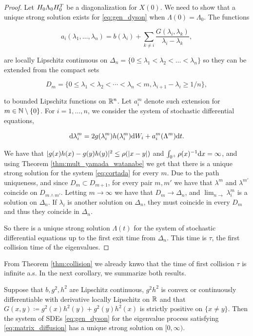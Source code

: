 \begin{proof}
    Let $H_0 \Lambda_0 H_0^T$ be a diagonalization for $X(0)$. We need to show that a unique strong solution exists for \eqref{eq:gen_dyson} when $\Lambda(0)=\Lambda_0$. The functions
    
    \[ a_i(\lambda_1, \dots,\lambda_n) = b(\lambda_i) + \sum_{k \neq i} \frac{G(\lambda_i,\lambda_k)}{\lambda_i - \lambda_k}, \]

    \noindent are locally Lipschitz continuous on $\Delta_n = \{ 0 \le \lambda_1 < \lambda_2 < \dots < \lambda_n \}$ so they can be extended from the compact sets 

    \[ D_m = \{ 0 \le \lambda_1 < \lambda_2 < \cdots < \lambda_n < m, \lambda_{i+1} - \lambda_i \ge 1/n \}, \]

    \noindent to bounded Lipschitz functions on $\mathbb R^n$. Let $a_i^m$ denote such extension for $m \in \mathbb N \setminus \{0\}$. For $i = 1, \dots, n$, we consider the system of stochastic differential equations,

    \begin{equation}
        \mathrm d \lambda^m_i = 2g(\lambda_i^m)h(\lambda_i^m)\mathrm d W_i + a_i^m(\Lambda^m) \mathrm d t. \label{eq:cortada}
    \end{equation}

    We have that $\lvert g(x)h(x) - g(y)h(y) \rvert^2 \le \rho(\lvert x-y \rvert)$ and $\int_{0^+} \rho(x)^{-1}\mathrm d x=\infty$, and using Theorem \ref{thm:mult_yamada_watanabe} we get that there is a unique strong solution for the system \eqref{eq:cortada} for every $m$. Due to the path uniqueness, and since $D_m \subset D_{m+1}$, for every pair $m,m'$ we have that $\lambda^m$ and $\lambda^{m'}$ coincide on $D_{m \wedge m'}$. Letting $m\to \infty$ we have that $D_m \to \Delta_n$, and $\lim_{n\to}\lambda_i^m$ is a solution on $\Delta_n$. If $\lambda_i$ is another solution on $\Delta_n$, they must coincide in every $D_m$ and thus they coincide in $\Delta_n$. 
    
    So there is a unique strong solution $\Lambda(t)$ for the system of stochastic differential equations up to the first exit time from $\Delta_n$. This time is $\tau$, the first collision time of the eigenvalues.
\end{proof}

From Theorem \ref{thm:collision} we already knwo that the time of first collision $\tau$ is infinite a.s. In the next corollary, we summarize both results.

\begin{corollary} \label{corollary:todo_junto}
    Suppose that $b, g^2, h^2$ are Lipschitz continuous, $g^2h^2$ is convex or continuously differentiable with derivative locally Lipschitz on $\mathbb R$ and that $G(x,y) \coloneqq g^2(x)h^2(y) + g^2(y)h^2(x)$ is strictly positive on $\{x \neq y\}$. Then the system of SDEs \eqref{eq:gen_dyson} for the eigenvalue process satisfying \eqref{eq:matrix_diffusion} has a unique strong solution on $[0,\infty)$.
\end{corollary}

